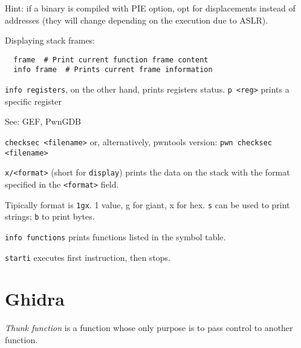 Hint: if a binary is compiled with PIE option, opt for displacements instead of addresses (they will change depending on the execution due to ASLR).

Displaying stack frames:
\begin{verbatim}
  frame  # Print current function frame content
  info frame  # Prints current frame information
\end{verbatim}

\texttt{info registers}, on the other hand, prints registers status. \texttt{p <reg>} prints a specific register

See: GEF, PwnGDB

\texttt{checksec <filename>} or, alternatively, pwntools version: \texttt{pwn checksec <filename>}

\texttt{x/<format>} (short for \texttt{display}) prints the data on the stack with the format specified in the \texttt{<format>} field.

Tipically format is \texttt{1gx}. 1 value, g for giant, x for hex. \texttt{s} can be used to print strings; \texttt{b} to print bytes.

\texttt{info functions} prints functions listed in the symbol table.

\texttt{starti} executes first instruction, then stops.

\section{Ghidra}
\textit{Thunk function} is a function whose only purpose is to pass control to another function.
